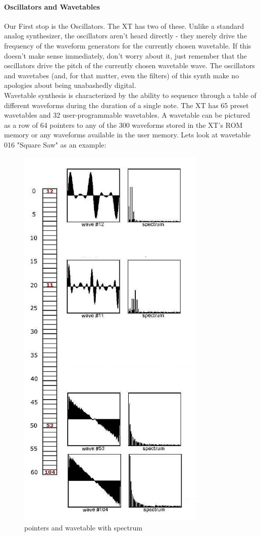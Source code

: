 \paragraph{Oscillators and Wavetables}
Our First stop is the Oscillators. The XT has two of these. Unlike a standard analog synthesizer, the oscillators aren't heard directly - they merely drive the frequency of the waveform generators for the currently chosen wavetable. If this doesn't make sense immediately, don't worry about it, just remember that the oscillators drive the pitch of the currently chosen wavetable wave. The oscillators and wavetabes (and, for that matter, even the filters) of this synth make no apologies about being unabashedly digital.\\
Wavetable synthesis is characterized by the ability to sequence through a table of different waveforms during the duration of a single note. The XT has 65 preset wavetables and 32 user-programmable wavetables. A wavetable can be pictured as a row of 64 pointers to any of the 300 waveforms stored in the XT's ROM memory or any waveforms available in the user memory. Lets look at wavetable 016 "Square Saw" as an example:
\begin{figure}[ht!]
	\centering
	\includegraphics[width=90mm]{pics/osc_wt.jpg}
	\caption{pointers and wavetable with spectrum}
	\label{osc_wt}
\end{figure}
